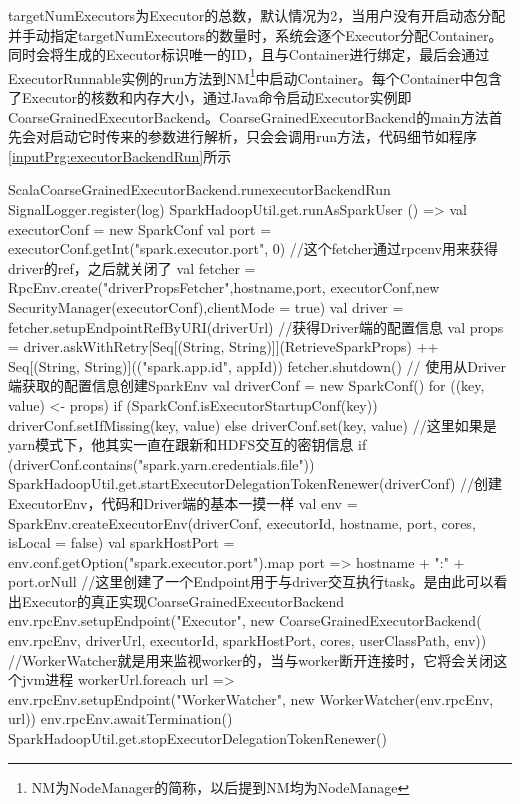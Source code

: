 targetNumExecutors为Executor的总数，默认情况为2，当用户没有开启动态分配并手动指定targetNumExecutors的数量时，系统会逐个Executor分配Container。同时会将生成的Executor标识唯一的ID，且与Container进行绑定，最后会通过ExecutorRunnable实例的run方法到NM\footnote{NM为NodeManager的简称，以后提到NM均为NodeManage}中启动Container。每个Container中包含了Executor的核数和内存大小，通过Java命令启动Executor实例即CoarseGrainedExecutorBackend。CoarseGrainedExecutorBackend的main方法首先会对启动它时传来的参数进行解析，只会会调用run方法，代码细节如程序\ref{inputPrg:executorBackendRun}所示
\begin{codeInput}{Scala}{CoarseGrainedExecutorBackend.run}{executorBackendRun}
SignalLogger.register(log)
SparkHadoopUtil.get.runAsSparkUser { () =>
  val executorConf = new SparkConf
  val port = executorConf.getInt("spark.executor.port", 0)
  //这个fetcher通过rpcenv用来获得driver的ref，之后就关闭了
  val fetcher = RpcEnv.create("driverPropsFetcher",hostname,port,
  executorConf,new SecurityManager(executorConf),clientMode = true)
  val driver = fetcher.setupEndpointRefByURI(driverUrl)
  //获得Driver端的配置信息
  val props = driver.askWithRetry[Seq[(String, String)]](RetrieveSparkProps) ++
  Seq[(String, String)](("spark.app.id", appId))
  fetcher.shutdown()	
  // 使用从Driver端获取的配置信息创建SparkEnv
  val driverConf = new SparkConf()
    for ((key, value) <- props) {
      if (SparkConf.isExecutorStartupConf(key)) {
        driverConf.setIfMissing(key, value)
      } else {
        driverConf.set(key, value)
      }
    }
  //这里如果是yarn模式下，他其实一直在跟新和HDFS交互的密钥信息
  if (driverConf.contains("spark.yarn.credentials.file")) {
    SparkHadoopUtil.get.startExecutorDelegationTokenRenewer(driverConf)
  }
  //创建ExecutorEnv，代码和Driver端的基本一摸一样
  val env = SparkEnv.createExecutorEnv(driverConf, executorId, hostname, port, cores, isLocal = false)	
  val sparkHostPort = env.conf.getOption("spark.executor.port").map { port =>
    hostname + ":" + port}.orNull
  //这里创建了一个Endpoint用于与driver交互执行task。是由此可以看出Executor的真正实现CoarseGrainedExecutorBackend
  env.rpcEnv.setupEndpoint("Executor", new CoarseGrainedExecutorBackend(
  env.rpcEnv, driverUrl, executorId, sparkHostPort, cores, userClassPath, env))
  //WorkerWatcher就是用来监视worker的，当与worker断开连接时，它将会关闭这个jvm进程
  workerUrl.foreach { url =>
    env.rpcEnv.setupEndpoint("WorkerWatcher", new WorkerWatcher(env.rpcEnv, url))
  }
  env.rpcEnv.awaitTermination()
  SparkHadoopUtil.get.stopExecutorDelegationTokenRenewer()
}
\end{codeInput}

